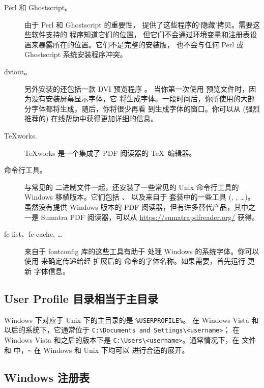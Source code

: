 \documentclass{article}
\begin{document}
\begin{description}
  \item[Perl 和 Ghostscript。] 由于 Perl 和  Ghostscript 的重要性，\TL{}
    提供了这些程序的`隐藏'拷贝。需要这些软件支持的 \TL{} 程序知道它们的位置，
    但它们不会通过环境变量和注册表设置来暴露所在的位置。它们不是完整的安装版，
    也不会与任何 Perl 或 Ghostscript 系统安装程序冲突。

  \item[dviout。] 另外安装的还包括一款 DVI 预览程序 。
    当你第一次使用  预览文件时，因为没有安装屏幕显示字体，它
    将生成字体。一段时间后，你所使用的大部分字体都将生成，随后，你将很少再看
    到生成字体的窗口。你可以从 (强烈推荐的) 在线帮助中获得更加详细的信息。

  \item[\TeX{}works.]  \TeX{}works 是一个集成了 PDF 阅读器的
    \TeX\ 编辑器。

  \item[命令行工具。] 与常见的 \TL{} 二进制文件一起，还安装了一些常见的
    Unix 命令行工具的 Windows 移植版本。它们包括 、
     以及来自于  套装中的一些工具
    (, , \ldots)。
    虽然没有提供 Windows 版本的 PDF 阅读器，但有许多替代产品，其中之一是
    Sumatra PDF 阅读器，可以从 \url{https://sumatrapdfreader.org/} 获得。

  \item[fc-list、fc-cache, \ldots] 来自于 fontconfig 库的这些工具有助于 \XeTeX{}
    处理 Windows 的系统字体。你可以使用  来确定传递给经 \XeTeX
    扩展后的  命令的字体名称。如果需要，首先运行  更新
    字体信息。
\end{description}


\subsection{User Profile 目录相当于主目录}
\label{sec:winhome}

Windows 下对应于 Unix 下的主目录的是 \verb|%USERPROFILE%|。
在 Windows Vista 和以后的系统下，它通常位于
\verb|C:\Documents and Settings\<username>|；
在 Windows Vista 和之后的版本下是 \verb|C:\Users\<username>|。通常情况下，在
 文件和 \KPS{} 中，\verb|~| 在 Windows 和 Unix 下均可以
进行合适的展开。

\subsection{Windows 注册表}
\label{sec:registry}
\end{document}
